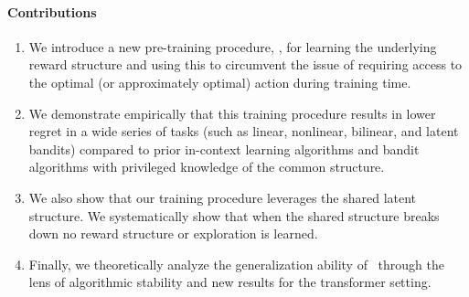 \paragraph{Contributions}
\begin{enumerate}
    \item We introduce a new pre-training procedure, \pred, for learning the underlying reward structure and using this to circumvent the issue of requiring access to the optimal (or approximately optimal) action during training time.
    \item We demonstrate empirically that this training procedure results in lower regret in a wide series of tasks (such as linear, nonlinear, bilinear, and latent bandits) compared to prior in-context learning algorithms and bandit algorithms with privileged knowledge of the common structure.
    \item We also show that our training procedure leverages the shared latent structure. We systematically show that when the shared structure breaks down no reward structure or exploration is learned.
    \item Finally, we theoretically analyze the generalization ability of \pred\ through the lens of algorithmic stability and new results for the transformer setting.
\end{enumerate}


